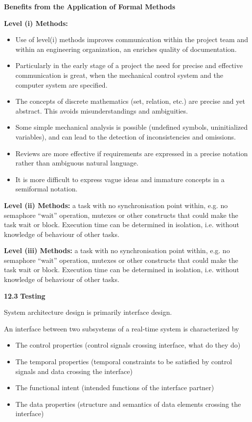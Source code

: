 \textbf{Benefits from the Application of Formal Methods}

\textbf{Level (i) Methods:}

\begin{itemize}
\item
  Use of level(i) methods improves communication within the project team
  and within an engineering organization, an enriches quality of
  documentation.
\item
  Particularly in the early stage of a project the need for precise and
  effective communication is great, when the mechanical control system
  and the computer system are specified.
\item
  The concepts of discrete mathematics (set, relation, etc.) are precise
  and yet abstract. This avoids misunderstandings and ambiguities.
\item
  Some simple mechanical analysis is possible (undefined symbols,
  uninitialized variables), and can lead to the detection of
  inconsistencies and omissions.
\item
  Reviews are more effective if requirements are expressed in a precise
  notation rather than ambiguous natural language.
\item
  It is more difficult to express vague ideas and immature concepts in a
  semiformal notation.
\end{itemize}

\textbf{Level (ii) Methods:} a task with no synchronisation point
within, e.g. no semaphore ``wait'' operation, mutexes or other
constructs that could make the task wait or block. Execution time can be
determined in isolation, i.e. without knowledge of behaviour of other
tasks.

\textbf{Level (iii) Methods:} a task with no synchronisation point
within, e.g. no semaphore ``wait'' operation, mutexes or other
constructs that could make the task wait or block. Execution time can be
determined in isolation, i.e. without knowledge of behaviour of other
tasks.

\textbf{12.3} \protect\hypertarget{teil4}{}{}\textbf{Testing }

System architecture design is primarily interface design.

An interface between two subsystems of a real-time system is
characterized by

\begin{itemize}
\item
  The control properties (control signals crossing interface, what do
  they do)
\item
  The temporal properties (temporal constraints to be satisfied by
  control signals and data crossing the interface)
\item
  The functional intent (intended functions of the interface partner)
\item
  The data properties (structure and semantics of data elements crossing
  the interface)
\end{itemize}

